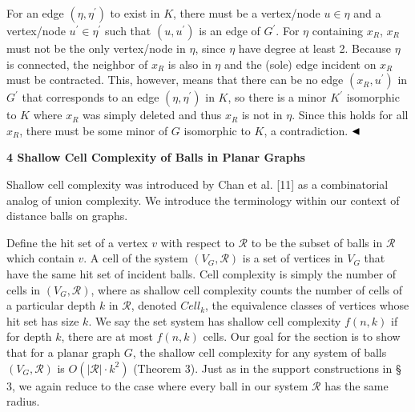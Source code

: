 For an edge $(\eta,\eta^{\prime})$ to exist in $K$, there must be a vertex/node $u\in\eta$ and a vertex/node $u^{\prime}\in\eta^{\prime}$ such that $(u,u^{\prime})$ is an edge of $G^{\prime}$. For $\eta$ containing $x_{R}$, $x_{R}$ must not be the only vertex/node in $\eta$, since $\eta$ have degree at least 2. Because $\eta$ is connected, the neighbor of $x_{R}$ is also in $\eta$ and the (sole) edge incident on $x_{R}$ must be contracted. This, however, means that there can be no edge $(x_{R},u^{\prime})$ in $G^{\prime}$ that corresponds to an edge $(\eta,\eta^{\prime})$ in $K$, so there is a minor $K^{\prime}$ isomorphic to $K$ where $x_{R}$ was simply deleted and thus $x_{R}$ is not in $\eta$. Since this holds for all $x_{R}$, there must be some minor of $G$ isomorphic to $K$, a contradiction. $\hfill\blacktriangleleft$
\par
\par
\par\medskip\noindent\textbf{4 Shallow Cell Complexity of Balls in Planar Graphs}\par
Shallow cell complexity was introduced by Chan et al. [11] as a combinatorial analog of union complexity. We introduce the terminology within our context of distance balls on graphs.
\par
\par
Define the hit set of a vertex $v$ with respect to $\mathcal{R}$ to be the subset of balls in $\mathcal{R}$ which contain $v$. A cell of the system $(V_{G},\mathcal{R})$ is a set of vertices in $V_{G}$ that have the same hit set of incident balls. Cell complexity is simply the number of cells in $(V_{G},\mathcal{R})$, where as shallow cell complexity counts the number of cells of a particular depth $k$ in $\mathcal{R}$, denoted $\mathit{Cell}_{k}$, the equivalence classes of vertices whose hit set has size $k$. We say the set system has shallow cell complexity $f(n,k)$ if for depth $k$, there are at most $f(n,k)$ cells. Our goal for the section is to show that for a planar graph $G$, the shallow cell complexity for any system of balls $(V_{G},\mathcal{R})$ is $O(|\mathcal{R}|\cdot k^{2})$ (Theorem 3). Just as in the support constructions in § 3, we again reduce to the case where every ball in our system $\mathcal{R}$ has the same radius.
\par
\par
